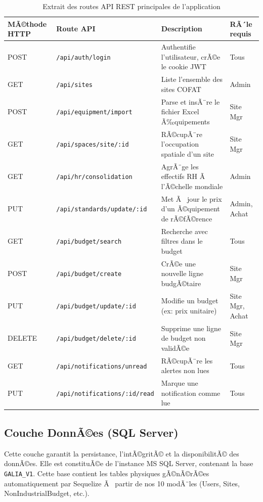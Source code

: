 \begin{table}[h]
\centering
\begin{tabular}{|p{2.5cm}|p{6cm}|p{4.5cm}|p{2cm}|}
\hline
\textbf{MÃ©thode HTTP} & \textbf{Route API} & \textbf{Description} & \textbf{RÃ´le requis} \\ \hline
POST & \texttt{/api/auth/login} & Authentifie l'utilisateur, crÃ©e le cookie JWT & Tous \\ \hline
GET & \texttt{/api/sites} & Liste l'ensemble des sites COFAT & Admin \\ \hline
POST & \texttt{/api/equipment/import} & Parse et insÃ¨re le fichier Excel Ã‰quipements & Site Mgr \\ \hline
GET & \texttt{/api/spaces/site/:id} & RÃ©cupÃ¨re l'occupation spatiale d'un site & Site Mgr \\ \hline
GET & \texttt{/api/hr/consolidation} & AgrÃ¨ge les effectifs RH Ã  l'Ã©chelle mondiale & Admin \\ \hline
PUT & \texttt{/api/standards/update/:id} & Met Ã  jour le prix d'un Ã©quipement de rÃ©fÃ©rence & Admin, Achat \\ \hline
GET & \texttt{/api/budget/search} & Recherche avec filtres dans le budget & Tous \\ \hline
POST & \texttt{/api/budget/create} & CrÃ©e une nouvelle ligne budgÃ©taire & Site Mgr \\ \hline
PUT & \texttt{/api/budget/update/:id} & Modifie un budget (ex: prix unitaire) & Site Mgr, Achat \\ \hline
DELETE & \texttt{/api/budget/delete/:id} & Supprime une ligne de budget non validÃ©e & Site Mgr \\ \hline
GET & \texttt{/api/notifications/unread} & RÃ©cupÃ¨re les alertes non lues & Tous \\ \hline
PUT & \texttt{/api/notifications/:id/read} & Marque une notification comme lue & Tous \\ \hline
\end{tabular}
\caption{Extrait des routes API REST principales de l'application}
\label{tab:api_endpoints}
\end{table}

\subsection{Couche DonnÃ©es (SQL Server)}
Cette couche garantit la persistance, l'intÃ©gritÃ© et la disponibilitÃ© des donnÃ©es. Elle est constituÃ©e de l'instance MS SQL Server, contenant la base \texttt{GALIA\_V1}. Cette base contient les tables physiques gÃ©nÃ©rÃ©es automatiquement par Sequelize Ã  partir de nos 10 modÃ¨les (Users, Sites, NonIndustrialBudget, etc.).

